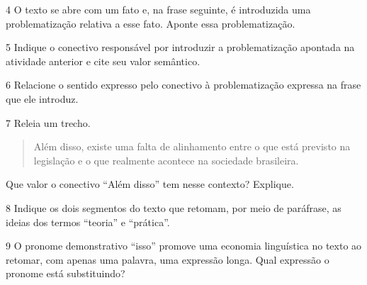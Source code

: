 
\num{4} O texto se abre com um fato e, na frase seguinte, é introduzida
uma problematização relativa a esse fato. Aponte essa problematização.


\num{5} Indique o conectivo responsável por introduzir a problematização
apontada na atividade anterior e cite seu valor semântico.


\num{6} Relacione o sentido expresso pelo conectivo à problematização
expressa na frase que ele introduz.


\num{7} Releia um trecho.

\begin{quote}
Além disso, existe uma falta de alinhamento entre o que está previsto na
legislação e o que realmente acontece na sociedade brasileira.
\end{quote}

Que valor o conectivo ``Além disso'' tem nesse contexto? Explique.


\num{8} Indique os dois segmentos do texto que retomam, por meio de
paráfrase, as ideias dos termos ``teoria'' e ``prática''.


\num{9} O pronome demonstrativo ``isso'' promove uma economia
linguística no texto ao retomar, com apenas uma palavra, uma expressão
longa. Qual expressão o pronome está substituindo?


